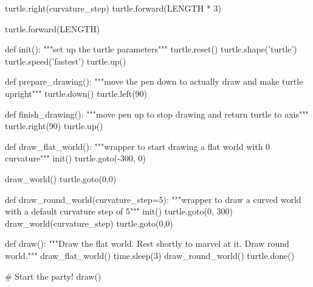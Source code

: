 {\begin{python}
            turtle.right(curvature_step)
            turtle.forward(LENGTH * 3)

        turtle.forward(LENGTH)


def init():
    """set up the turtle parameters"""
    turtle.reset()
    turtle.shape('turtle')
    turtle.speed('fastest')
    turtle.up()


def prepare_drawing():
    """move the pen down to actually draw and make turtle upright"""
    turtle.down()
    turtle.left(90)


def finish_drawing():
    """move pen up to stop drawing and return turtle to axis"""
    turtle.right(90)
    turtle.up()


def draw_flat_world():
    """wrapper to start drawing a flat world with 0 curvature"""
    init()
    turtle.goto(-300, 0)

    draw_world()
    turtle.goto(0,0)


def draw_round_world(curvature_step=5):
    """wrapper to draw a curved world with a default curvature step of 5"""
    init()
    turtle.goto(0, 300)
    draw_world(curvature_step)
    turtle.goto(0,0)


def draw():
    """Draw the flat world. Rest shortly to marvel at it. Draw round world."""
    draw_flat_world()
    time.sleep(3)
    draw_round_world()
    turtle.done()

# Start the party!
draw()

\end{python}
}


